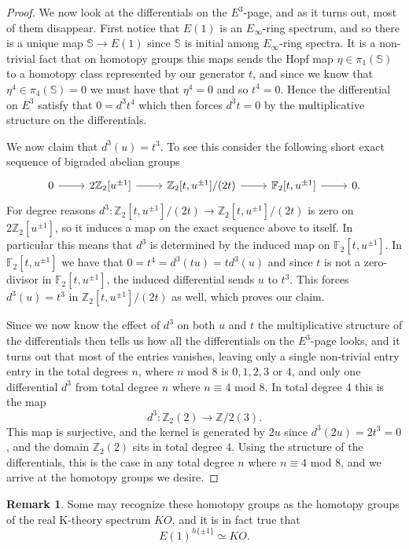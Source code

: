 \documentclass[a4paper]{article} %
\theoremstyle{definition}
\newtheorem{remark}[theorem]{Remark}
\newcommand{\Z}{\mathbb{Z}}
\newcommand{\F}{\mathbb{F}}
\newcommand{\Sph}{\mathbb{S}}
\begin{document}
\begin{proof}
We now look at the differentials on the $E^3$-page, and as it turns out, most of them disappear. First notice that $E(1)$ is an $E_\infty$-ring spectrum, and so there is a unique map $\Sph \to E(1)$ since $\Sph$ is initial among $E_\infty$-ring spectra. It is a non-trivial fact that on homotopy groups this maps sends the Hopf map $\eta \in \pi_1(\Sph)$ to a homotopy class represented by our generator $t$, and since we know that $\eta^4 \in \pi_4(\Sph) = 0$ we must have that $\eta^4 = 0$ and so $t^4 = 0$. Hence the differential on $E^3$ satisfy that $0 = d^3 t^4$
which then forces $d^3t = 0$ by the multiplicative structure on the differentials.

 We now claim that $d^3(u) = t^3$. To see this consider the following short exact sequence of bigraded abelian groups
 \[
\begin{tikzcd}
  0 \rar & 2\Z_2[u^{\pm 1}] \rar & \Z_2[t, u^{\pm 1}]/(2t) \rar & \F_2[t, u^{\pm 1}] \rar & 0.
\end{tikzcd}
 \]
 For degree reasons $d^3 \colon \Z_2[t, u^{\pm 1}]/(2t) \to \Z_2[t, u^{\pm 1}]/(2t)$ is zero on $2\Z_2[u^{\pm 1}]$, so it induces a map on the exact sequence above to itself. In particular this means that $d^3$ is determined by the induced map on $\F_2[t, u^{\pm 1}]$. In $\F_2[t, u^{\pm 1}]$ we have that $0 = t^4 = d^3(tu) = t d^3(u)$ and since
 $t$ is not a zero-divisor in $\F_2[t, u^{\pm 1}]$,
 the induced differential sends $u$ to $t^3$. This forces $d^3(u) = t^3$ in $\Z_2[t, u^{\pm 1}]/(2t)$ as well, which proves our claim.


Since we now know the effect of $d^3$ on both $u$ and $t$ the multiplicative structure of the differentials then tells us how all the differentials on the $E^3$-page looks, and it turns out that most of the entries vanishes, leaving only a single non-trivial entry entry in the total degrees $n$, where $n$ mod $8$ is $0, 1, 2 ,3$ or $4$, and only one differential $d^3$ from total degree $n$ where $n \equiv 4$ mod $8$. In total degree $4$ this is the map
\[
d^3 \colon \Z_2(2) \to \Z/2(3).
\]
This map is surjective, and the kernel is generated by $2u$ since $d^3(2u)=2t^3 = 0$, and the domain $\Z_2(2)$ sits in total degree $4$. Using the structure of the differentials, this is the case in any total degree $n$ where $n \equiv 4$ mod $8$, and we arrive at the homotopy groups we desire.
\end{proof}

\begin{remark}
  Some may recognize these homotopy groups as the homotopy groups of the real K-theory spectrum $KO$, and it is in fact true that
  \[
    E(1)^{h\{ \pm1\}} \simeq KO.
  \]
\end{remark}
\end{document}
